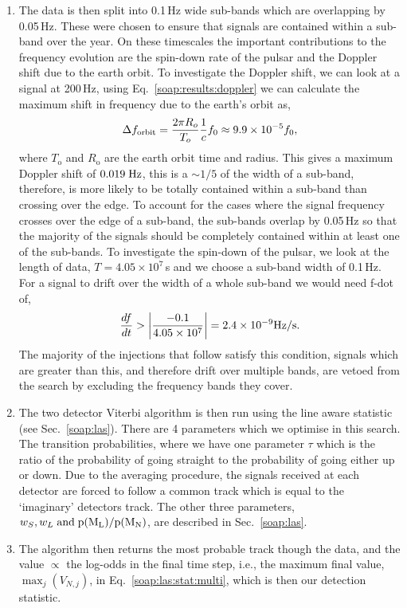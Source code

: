\begin{enumerate}
\item The data is then split into 0.1\,Hz wide sub-bands which are overlapping by 0.05\,Hz. These were chosen to ensure that signals are contained within a sub-band over the year. On these timescales the important contributions to the frequency evolution are the spin-down rate of the pulsar and the Doppler shift due to the earth orbit.
To investigate the Doppler shift, we can look at a signal at 200\,Hz, using Eq.~\ref{soap:results:doppler} we can calculate the maximum shift in frequency due to the earth's orbit as,
%
\begin{equation}
\label{soap:results:dforbit}
\Delta f_{\rm orbit} = \frac{2 \pi R_o}{T_o} \frac{1}{c} f_0 \approx 9.9 \times 10^{-5} f_0,
\end{equation}
%
where $T_{\text{o}}$ and $R_{\text{o}}$ are the
earth orbit time and radius. This gives a maximum Doppler shift of $0.019 \; \rm{Hz}$, this is a $\sim 1/5$ of the width of a sub-band, therefore, is more likely to be totally contained within a sub-band than crossing over the edge.
To account for the cases where the signal frequency crosses over the edge of a sub-band, the sub-bands overlap by 0.05\,Hz so that the majority of the signals should be completely contained within at least one of the sub-bands.
To investigate the spin-down of the pulsar, we look at the length of data, $T=4.05 \times 10^7$\,s and we choose a sub-band width of 0.1\,Hz. For a signal to drift over the width of a whole sub-band we would need f-dot of,
\begin{equation}
\frac{df}{dt} > \left|\frac{-0.1}{4.05 \times 10^7}\right| = 2.4 \times 10^{-9} \rm{Hz/s}.
\end{equation}
The majority of the injections that follow satisfy this condition, signals which are greater than this, and therefore drift over multiple bands, are vetoed from the search by excluding the frequency bands they cover.
%
\item The two detector Viterbi algorithm is then run using the line aware
statistic (see Sec.~\ref{soap:las}). There are 4 parameters which we optimise in this search. The transition probabilities, where we have one parameter $\tau$ which is the ratio of the probability
of going straight to the probability of going either up or down. Due to the averaging
procedure, the signals received at each detector are forced to follow a common track which is equal to the `imaginary' detectors track. The other three parameters, $w_S, w_L \; \rm{and} \; p(M_L)/p(M_N)$, are described in Sec.~\ref{soap:las}.
%
\item The algorithm then returns the most probable track though the data, and the value
$\propto$ the log-odds in the final time step, i.e., the
maximum final value, $\max_j(V_{N,j})$, in Eq.~\ref{soap:las:stat:multi}, which is then our detection statistic.

%
\end{enumerate}
